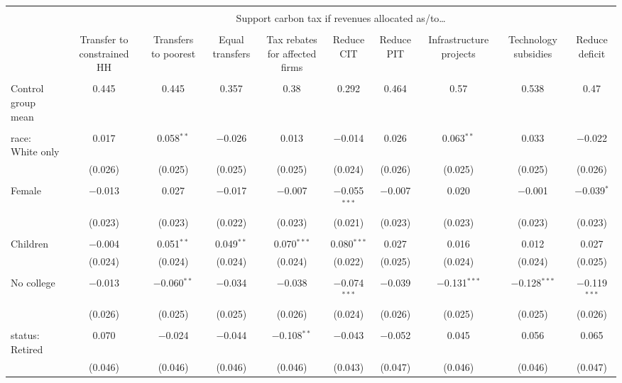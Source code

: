 
\begin{tabular}{@{\extracolsep{5pt}}lccccccccc} 
\\[-1.8ex]\hline 
\hline \\[-1.8ex] 
 & \multicolumn{9}{c}{Support carbon tax if revenues allocated as/to…} \\ 
\cline{2-10} 
\\[-1.8ex] & Transfer to constrained HH & Transfers to poorest & Equal transfers & Tax rebates for affected firms & Reduce CIT & Reduce PIT & Infrastructure projects & Technology subsidies & Reduce deficit \\ 
\hline \\[-1.8ex] 
 Control group mean & 0.445 & 0.445 & 0.357 & 0.38 & 0.292 & 0.464 & 0.57 & 0.538 & 0.47  \\ \hline \\[-1.8ex] race: White only & 0.017 & 0.058$^{**}$ & $-$0.026 & 0.013 & $-$0.014 & 0.026 & 0.063$^{**}$ & 0.033 & $-$0.022 \\ 
  & (0.026) & (0.025) & (0.025) & (0.025) & (0.024) & (0.026) & (0.025) & (0.025) & (0.026) \\ 
  & & & & & & & & & \\ 
 Female & $-$0.013 & 0.027 & $-$0.017 & $-$0.007 & $-$0.055$^{***}$ & $-$0.007 & 0.020 & $-$0.001 & $-$0.039$^{*}$ \\ 
  & (0.023) & (0.023) & (0.022) & (0.023) & (0.021) & (0.023) & (0.023) & (0.023) & (0.023) \\ 
  & & & & & & & & & \\ 
 Children & $-$0.004 & 0.051$^{**}$ & 0.049$^{**}$ & 0.070$^{***}$ & 0.080$^{***}$ & 0.027 & 0.016 & 0.012 & 0.027 \\ 
  & (0.024) & (0.024) & (0.024) & (0.024) & (0.022) & (0.025) & (0.024) & (0.024) & (0.025) \\ 
  & & & & & & & & & \\ 
 No college & $-$0.013 & $-$0.060$^{**}$ & $-$0.034 & $-$0.038 & $-$0.074$^{***}$ & $-$0.039 & $-$0.131$^{***}$ & $-$0.128$^{***}$ & $-$0.119$^{***}$ \\ 
  & (0.026) & (0.025) & (0.025) & (0.026) & (0.024) & (0.026) & (0.025) & (0.025) & (0.026) \\ 
  & & & & & & & & & \\ 
 status: Retired & 0.070 & $-$0.024 & $-$0.044 & $-$0.108$^{**}$ & $-$0.043 & $-$0.052 & 0.045 & 0.056 & 0.065 \\ 
  & (0.046) & (0.046) & (0.046) & (0.046) & (0.043) & (0.047) & (0.046) & (0.046) & (0.047) \\ 

\end{tabular}
